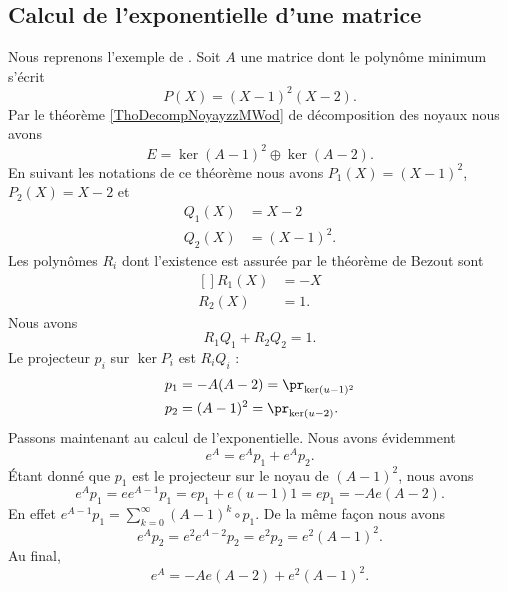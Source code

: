 \subsection{Calcul de l'exponentielle d'une matrice}

Nous reprenons l'exemple de \cite{MneimneReduct}. Soit \( A\) une matrice dont le polynôme minimum s'écrit
\begin{equation}
    P(X)=(X-1)^2(X-2).
\end{equation}
Par le théorème \ref{ThoDecompNoyayzzMWod} de décomposition des noyaux nous avons
\begin{equation}
    E=\ker(A-1)^2\oplus\ker(A-2).
\end{equation}
En suivant les notations de ce théorème nous avons \( P_1(X)=(X-1)^2\), \( P_2(X)=X-2\) et
\begin{subequations}
    \begin{align}
        Q_1(X)&=X-2\\
        Q_2(X)&=(X-1)^2.
    \end{align}
\end{subequations}
Les polynômes \( R_i\) dont l'existence est assurée par le théorème de Bezout sont
\begin{equation}
    \begin{aligned}[]
        R_1(X)&=-X\\
        R_2(X)&=1.
    \end{aligned}
\end{equation}
Nous avons
\begin{equation}
    R_1Q_1+R_2Q_2=1.
\end{equation}
Le projecteur \( p_i\) sur \( \ker P_i\) est \( R_iQ_i\) :
\begin{equation}
    \begin{aligned}[]
        p_1&=-A(A-2)=\pr_{\ker(u-1)^2}\\
        p_2&=(A-1)^2=\pr_{\ker(u-2)}.
    \end{aligned}
\end{equation}
Passons maintenant au calcul de l'exponentielle. Nous avons évidemment
\begin{equation}
    e^A=e^Ap_1+e^Ap_2.
\end{equation}
Étant donné que \( p_1\) est le projecteur sur le noyau de \( (A-1)^2\), nous avons
\begin{equation}
    e^Ap_1=ee^{A-1}p_1=ep_1+e(u-1)1=ep_1=-Ae(A-2).
\end{equation}
En effet \( e^{A-1}p_1=\sum_{k=0}^{\infty}(A-1)^k\circ p_1\). De la même façon nous avons
\begin{equation}
    e^Ap_2=e^2e^{A-2}p_2=e^2p_2=e^2(A-1)^2.
\end{equation}
Au final,
\begin{equation}
    e^A=-Ae(A-2)+e^2(A-1)^2.
\end{equation}

